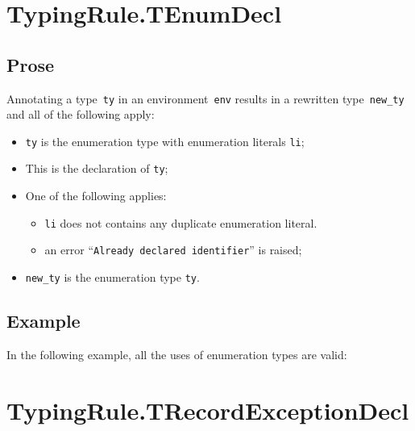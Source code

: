 \documentclass{book}
\begin{document}
\begin{itemize}


\section{TypingRule.TEnumDecl \label{sec:TypingRule.TEnumDecl}}

\subsection{Prose}
Annotating a type~\texttt{ty} in an environment~\texttt{env} results in a
rewritten type~\texttt{new\_ty} and all of the following apply:
\begin{itemize}
  \item \texttt{ty} is the enumeration type with enumeration literals
    \texttt{li};
  \item This is the declaration of \texttt{ty};
  \item One of the following applies:
    \begin{itemize}
      \item \texttt{li} does not contains any duplicate enumeration literal.
      \item an error ``\texttt{Already declared identifier}'' is raised;
    \end{itemize}
  \item \texttt{new\_ty} is the enumeration type \texttt{ty}.
\end{itemize}

\subsection{Example}
In the following example, all the uses of enumeration types are valid:







\section{TypingRule.TRecordExceptionDecl \label{sec:TypingRule.TRecordExceptionDecl}}


\end{itemize}
\end{document}

